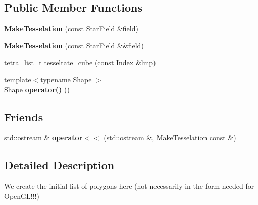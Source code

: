 \subsection*{Public Member Functions}
\begin{DoxyCompactItemize}
\item 
\mbox{\label{classmgs_1_1march_1_1MakeTesselation_a20e3550be02146d8560874d3597f1c86}} 
{\bfseries Make\+Tesselation} (const \hyperlink{namespacemgs_a7908010cda249b8bf1ea06572a4d4984}{Star\+Field} \&field)
\item 
\mbox{\label{classmgs_1_1march_1_1MakeTesselation_a44841d513754e6cee703e6fc006fda14}} 
{\bfseries Make\+Tesselation} (const \hyperlink{namespacemgs_a7908010cda249b8bf1ea06572a4d4984}{Star\+Field} \&\&field)
\item 
tetra\+\_\+list\+\_\+t \hyperlink{classmgs_1_1march_1_1MakeTesselation_ace6aa58a0636038e85d187de142e1aa9}{tesseltate\+\_\+cube} (const \hyperlink{structmgs_1_1Index}{Index} \&lmp)
\item 
\mbox{\label{classmgs_1_1march_1_1MakeTesselation_a30d8d7305f8d8904f77d9a4f27371430}} 
{\footnotesize template$<$typename Shape $>$ }\\Shape {\bfseries operator()} ()
\end{DoxyCompactItemize}
\subsection*{Friends}
\begin{DoxyCompactItemize}
\item 
\mbox{\label{classmgs_1_1march_1_1MakeTesselation_aa764f607aa3ba2f179283acdf41c5c7c}} 
std\+::ostream \& {\bfseries operator$<$$<$} (std\+::ostream \&, \hyperlink{classmgs_1_1march_1_1MakeTesselation}{Make\+Tesselation} const \&)
\end{DoxyCompactItemize}


\subsection{Detailed Description}
We create the initial list of polygons here (not necessarily in the form needed for Open\+G\+L!!!) 

